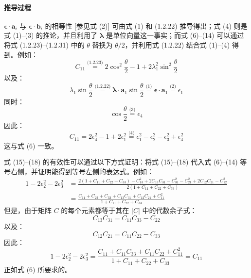 \paragraph{推导过程}
\(\boldsymbol{\epsilon} \cdot \mathbf{a}_i\) 与 \(\boldsymbol{\epsilon} \cdot \mathbf{b}_i\) 的相等性 [参见式 (2)] 可由式 (1) 和 (1.2.22) 推导得出；式 (4) 则是式 (1)--(3) 的推论，并且利用了 \(\boldsymbol{\lambda}\) 是单位向量这一事实；而式 (6)--(14) 可以通过将式 (1.2.23)--(1.2.31) 中的 \(\theta\) 替换为 \(\theta/2\)，并利用式 (1.2.22) 结合式 (1)--(4) 得到。例如：
\begin{equation}
C_{11} \overset{\text{(1.2.23)}}{=} 2 \cos^2\frac{\theta}{2} - 1 + 2\lambda_1^2 \sin^2\frac{\theta}{2} \tag{22}
\end{equation}
以及：
\begin{equation}
\lambda_1 \sin\frac{\theta}{2} \overset{\text{(1.2.22)}}{=} \boldsymbol{\lambda} \cdot \mathbf{a}_1 \sin\frac{\theta}{2} \overset{\text{(1)}}{=} \boldsymbol{\epsilon} \cdot \mathbf{a}_1 \overset{\text{(2)}}{=} \epsilon_1 \tag{23}
\end{equation}
同时：
\begin{equation}
\cos\frac{\theta}{2} \overset{\text{(3)}}{=} \epsilon_4 \tag{24}
\end{equation}
因此：
\begin{equation}
C_{11} = 2\epsilon_4^2 - 1 + 2\epsilon_1^2 \overset{\text{(4)}}{=} \epsilon_1^2 - \epsilon_2^2 - \epsilon_3^2 + \epsilon_4^2 \tag{25}
\end{equation}
这与式 (6) 一致。

式 (15)--(18) 的有效性可以通过以下方式证明：将式 (15)--(18) 代入式 (6)--(14) 等号右侧，并证明能得到等号左侧的表达式。例如：
\begin{align}
1 - 2\epsilon_2^2 - 2\epsilon_3^2 &= \frac{2(1 + C_{11} + C_{22} + C_{33}) - C_{13}^2 + 2C_{13}C_{31} - C_{31}^2 - C_{21}^2 + 2C_{12}C_{21} - C_{12}^2}{2(1 + C_{11} + C_{22} + C_{33})} \nonumber \\
&= \frac{C_{11} + C_{22} + C_{33} + C_{13}C_{31} + C_{12}C_{21} + C_{11}^2}{1 + C_{11} + C_{22} + C_{33}} \tag{26}
\end{align}
但是，由于矩阵 \(C\) 的每个元素都等于其在 \(|C|\) 中的代数余子式：
\begin{equation}
C_{13}C_{31} = C_{11}C_{33} - C_{22} \tag{27}
\end{equation}
以及：
\begin{equation}
C_{12}C_{21} = C_{11}C_{22} - C_{33} \tag{28}
\end{equation}
因此：
\begin{equation}
1 - 2\epsilon_2^2 - 2\epsilon_3^2 = \frac{C_{11} + C_{11}C_{33} + C_{11}C_{22} + C_{11}^2}{1 + C_{11} + C_{22} + C_{33}} = C_{11} \tag{29}
\end{equation}
正如式 (6) 所要求的。

